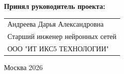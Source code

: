 \begin{titlepage}
\vspace{1em}
{\bf Принял руководитель проекта: \vspace{2mm}}

{
\begin{tabular}{l}
Андреева Дарья Александровна\\
Старший инженер нейронных сетей\\
ООО "ИТ ИКС5 ТЕХНОЛОГИИ"
\end{tabular}}





\vspace{\fill}

\begin{center}
Москва 2026
\end{center}

\end{titlepage}